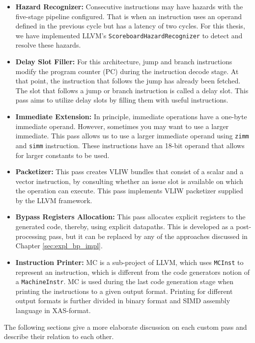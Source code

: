 \begin{itemize}
	\item \textbf{Hazard Recognizer:} Consecutive instructions may have hazards with the five-stage pipeline configured. That is when an instruction uses an operand defined in the previous cycle but has a latency of two cycles. For this thesis, we have implemented LLVM's \texttt{ScoreboardHazardRecognizer} to detect and resolve these hazards.
	\item \textbf{Delay Slot Filler:} For this architecture, jump and branch instructions modify the program counter (PC) during the instruction decode stage. At that point, the instruction that follows the jump has already been fetched. The slot that follows a jump or branch instruction is called a delay slot. This pass aims to utilize delay slots by filling them with useful instructions.%
	\item \textbf{Immediate Extension:} In principle, immediate operations have a one-byte immediate operand. However, sometimes you may want to use a larger immediate. This pass allows us to use a larger immediate operand using \texttt{zimm} and \texttt{simm} instruction. These instructions have an 18-bit operand that allows for larger constants to be used.%
	\item \textbf{Packetizer:} This pass creates VLIW bundles that consist of a scalar and a vector instruction, by consulting whether an issue slot is available on which the operation can execute. This pass implements VLIW packetizer supplied by the LLVM framework.
	\item \textbf{Bypass Registers Allocation:} This pass allocates explicit registers to the generated code, thereby, using explicit datapaths. This is developed as a post-processing pass, but it can be replaced by any of the approaches discussed in Chapter \ref{sec:expl_bp_impl}.
	\item \textbf{Instruction Printer:} MC is a sub-project of LLVM, which uses \texttt{MCInst} to represent an instruction, which is different from the code generators notion of a \texttt{MachineInstr}. MC is used during the last code generation stage when printing the instructions to a given output format. Printing for different output formats is further divided in binary format and SIMD assembly language in XAS-format. 


\end{itemize}
The following sections give a more elaborate discussion on each custom pass and describe their relation to each other.

